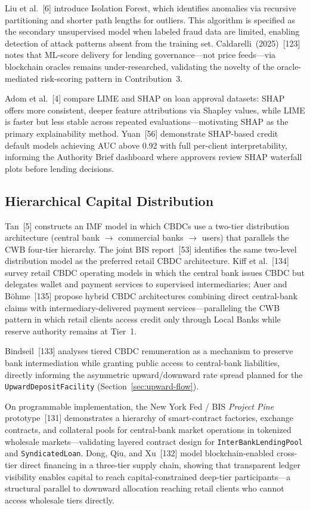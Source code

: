 \documentclass[12pt,a4paper]{report}
\begin{document}
Liu et al.~[6] introduce Isolation Forest, which identifies anomalies via recursive partitioning and shorter path lengths for outliers. This algorithm is specified as the secondary unsupervised model when labeled fraud data are limited, enabling detection of attack patterns absent from the training set. Caldarelli~(2025)~[123] notes that ML-score delivery for lending governance---not price feeds---via blockchain oracles remains under-researched, validating the novelty of the oracle-mediated risk-scoring pattern in Contribution~3.

Adom et al.~[4] compare LIME and SHAP on loan approval datasets: SHAP offers more consistent, deeper feature attributions via Shapley values, while LIME is faster but less stable across repeated evaluations---motivating SHAP as the primary explainability method. Yuan~[56] demonstrate SHAP-based credit default models achieving AUC above 0.92 with full per-client interpretability, informing the Authority Brief dashboard where approvers review SHAP waterfall plots before lending decisions.

\subsection{Hierarchical Capital Distribution}
\label{sec:lit-cross-tier}

Tan~[5] constructs an IMF model in which CBDCs use a two-tier distribution architecture (central bank $\to$ commercial banks $\to$ users) that parallels the CWB four-tier hierarchy. The joint BIS report~[53] identifies the same two-level distribution model as the preferred retail CBDC architecture. Kiff et al.~[134] survey retail CBDC operating models in which the central bank issues CBDC but delegates wallet and payment services to supervised intermediaries; Auer and B\"{o}hme~[135] propose hybrid CBDC architectures combining direct central-bank claims with intermediary-delivered payment services---paralleling the CWB pattern in which retail clients access credit only through Local Banks while reserve authority remains at Tier~1.

Bindseil~[133] analyses tiered CBDC remuneration as a mechanism to preserve bank intermediation while granting public access to central-bank liabilities, directly informing the asymmetric upward/downward rate spread planned for the \texttt{UpwardDepositFacility} (Section~\ref{sec:upward-flow}).

On programmable implementation, the New York Fed / BIS \textit{Project Pine} prototype~[131] demonstrates a hierarchy of smart-contract factories, exchange contracts, and collateral pools for central-bank market operations in tokenized wholesale markets---validating layered contract design for \texttt{InterBankLendingPool} and \texttt{SyndicatedLoan}. Dong, Qiu, and Xu~[132] model blockchain-enabled cross-tier direct financing in a three-tier supply chain, showing that transparent ledger visibility enables capital to reach capital-constrained deep-tier participants---a structural parallel to downward allocation reaching retail clients who cannot access wholesale tiers directly.
\end{document}

